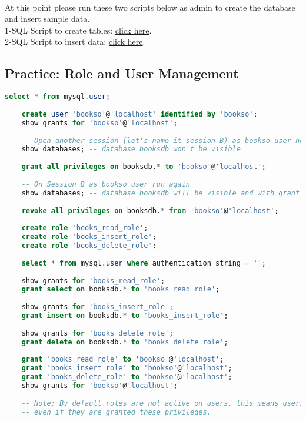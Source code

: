 \paragraph{} At this point please run these two scripts below as admin to create the database and insert sample data.\\
1-SQL Script to create tables: \href{file:./source-items/sql/books-db-init/booksdb-create-tables.sql}{click here}.\\
2-SQL Script to insert data: \href{file:./source-items/sql/books-db-init/booksdb-insert-data.sql}{click here}.
\subsection{Practice: Role and User Management}
\begin{lstlisting}[language=SQL]
	select * from mysql.user;
	
	create user 'bookso'@'localhost' identified by 'bookso';
	show grants for 'bookso'@'localhost';
	
	-- Open another session (let's name it session B) as bookso user now and run
	show databases; -- database booksdb won't be visible
	
	grant all privileges on booksdb.* to 'bookso'@'localhost';
	
	-- On Session B as bookso user run again
	show databases; -- database booksdb will be visible and with grant all we are able to do any operation on the db
	
	revoke all privileges on booksdb.* from 'bookso'@'localhost';
	
	create role 'books_read_role';
	create role 'books_insert_role';
	create role 'books_delete_role';
	
	select * from mysql.user where authentication_string = '';
	
	show grants for 'books_read_role';
	grant select on booksdb.* to 'books_read_role';
	
	show grants for 'books_insert_role';
	grant insert on booksdb.* to 'books_insert_role';
	
	show grants for 'books_delete_role';
	grant delete on booksdb.* to 'books_delete_role';
	
	grant 'books_read_role' to 'bookso'@'localhost';
	grant 'books_insert_role' to 'bookso'@'localhost';
	grant 'books_delete_role' to 'bookso'@'localhost';
	show grants for 'bookso'@'localhost';
	
	-- Note: By default roles are not active on users, this means users won't have these privileges
	-- even if they are granted these privileges.
	

\end{lstlisting}

